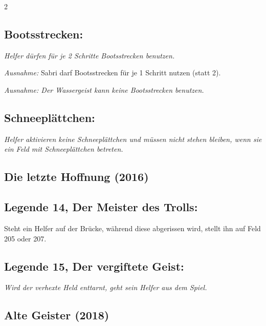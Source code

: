 \documentclass[10pt, a4paper, oneside]{book}
\newcommand{\fan}[1]{\textit{#1}}
\begin{document}
\begin{multicols*}{2}
\begin{bgcolor}
\subsection{Bootsstrecken:}

\fan{Helfer dürfen für je 2 Schritte Bootsstrecken benutzen.}
\supercite{bl-rdsk-der-unbekannte-krieger}

\fan{Ausnahme:} Sabri darf Bootsstrecken für je 1 Schritt nutzen (statt 2).
\supercite{mh-begleitheft}

\fan{Ausnahme: Der Wassergeist kann keine Bootsstrecken benutzen.}



\subsection{Schneeplättchen:}

\fan{Helfer aktivieren keine Schneeplättchen und müssen nicht stehen bleiben, wenn sie ein Feld mit Schneeplättchen betreten.}

\end{bgcolor}



\begin{bgcolor}
\section{Die letzte Hoffnung (2016)}




\subsection{Legende 14, Der Meister des Trolls:}

Steht ein Helfer auf der Brücke, während diese abgerissen wird, stellt ihn auf Feld 205 oder 207.
\supercite{94128}


\subsection{Legende 15, Der vergiftete Geist:}

\fan{Wird der verhexte Held enttarnt, geht sein Helfer aus dem Spiel.}


\end{bgcolor}



\begin{bgcolor}[color-ag]
\section{Alte Geister (2018)}


\end{bgcolor}
\end{multicols*}
\end{document}
